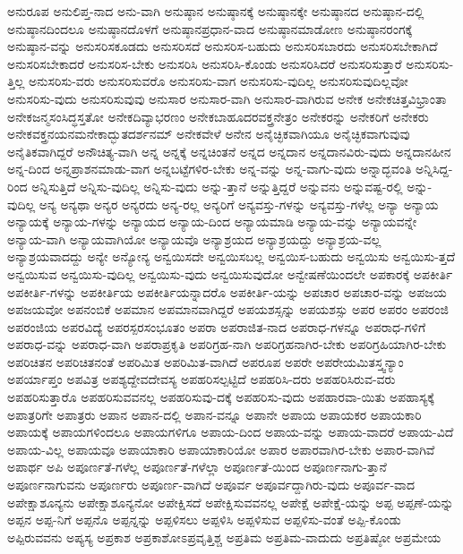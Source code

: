 {ಅನುರೂಪ
ಅನುಲಿಪ್ತ-ನಾದ
ಅನು-ವಾಗಿ
ಅನುಷ್ಠಾನ
ಅನುಷ್ಠಾನಕ್ಕೆ
ಅನುಷ್ಠಾನಕ್ಕೇ
ಅನುಷ್ಠಾನದ
ಅನುಷ್ಠಾನ-ದಲ್ಲಿ
ಅನುಷ್ಠಾನದಿಂದಲೂ
ಅನುಷ್ಠಾನದೊಳಗೆ
ಅನುಷ್ಠಾನಪ್ರಧಾನ-ವಾದ
ಅನುಷ್ಠಾನಮಾಡೋಣ
ಅನುಷ್ಠಾನರಂಗಕ್ಕೆ
ಅನುಷ್ಠಾನ-ವನ್ನು
ಅನುಸರಿಸಕೂಡದು
ಅನುಸರಿಸದೆ
ಅನುಸರಿಸ-ಬಹುದು
ಅನುಸರಿಸಬಾರದು
ಅನುಸರಿಸಬೇಕಾಗಿದೆ
ಅನುಸರಿಸಬೇಕಾದರೆ
ಅನುಸರಿಸ-ಬೇಕು
ಅನುಸರಿಸಿ
ಅನುಸರಿಸಿ-ಕೊಂಡು
ಅನುಸರಿಸಿದರೆ
ಅನುಸರಿಸುತ್ತಾರೆ
ಅನುಸರಿಸು-ತ್ತಿಲ್ಲ
ಅನುಸರಿಸು-ವರು
ಅನುಸರಿಸುವರೊ
ಅನುಸರಿಸು-ವಾಗ
ಅನುಸರಿಸು-ವುದಿಲ್ಲ
ಅನುಸರಿಸುವುದಿಲ್ಲವೋ
ಅನುಸರಿಸು-ವುದು
ಅನುಸರಿಸುವುವು
ಅನುಸಾರ
ಅನುಸಾರ-ವಾಗಿ
ಅನುಸಾರ-ವಾಗಿರುವ
ಅನೇಕ
ಅನೇಕಚಿತ್ತವಿಭ್ರಾಂತಾ
ಅನೇಕಜನ್ಮಸಂಸಿದ್ಧಸ್ತತೋ
ಅನೇಕದಿವ್ಯಾಭರಣಂ
ಅನೇಕಬಾಹೂದರವಕ್ತ್ರನೇತ್ರಂ
ಅನೇಕರನ್ನು
ಅನೇಕರಿಗೆ
ಅನೇಕರು
ಅನೇಕವಕ್ತ್ರನಯನಮನೇಕಾದ್ಭುತದರ್ಶನಮ್
ಅನೇಕವೇಳೆ
ಅನೇನ
ಅನೈಚ್ಛಿಕವಾಗಿಯೂ
ಅನೈಚ್ಛಿಕವಾಗುವುವು
ಅನೈತಿಕವಾಗಿದ್ದರೆ
ಅನೌಚಿತ್ಯ-ವಾಗಿ
ಅನ್ನ
ಅನ್ನಕ್ಕೆ
ಅನ್ನಚಿಂತನೆ
ಅನ್ನದ
ಅನ್ನದಾನ
ಅನ್ನದಾನವಿರು-ವುದು
ಅನ್ನದಾನಹೀನ
ಅನ್ನ-ದಿಂದ
ಅನ್ನಪ್ರಾಶನಮಾಡು-ವಾಗ
ಅನ್ನಬಟ್ಟೆಗಳಿರ-ಬೇಕು
ಅನ್ನ-ವನ್ನು
ಅನ್ನ-ವಾಗು-ವುದು
ಅನ್ನಾದ್ಭವಂತಿ
ಅನ್ನಿಸಿದ್ದ-ರಿಂದ
ಅನ್ನಿಸುತ್ತಿದೆ
ಅನ್ನಿಸು-ವುದಿಲ್ಲ
ಅನ್ನಿಸು-ವುದು
ಅನ್ನು-ತ್ತಾನೆ
ಅನ್ನುತ್ತಿದ್ದರೆ
ಅನ್ನುವನು
ಅನ್ನುವಷ್ಟ-ರಲ್ಲಿ
ಅನ್ನು-ವುದಿಲ್ಲ
ಅನ್ಯ
ಅನ್ಯಥಾ
ಅನ್ಯರ
ಅನ್ಯರದು
ಅನ್ಯ-ರಲ್ಲ
ಅನ್ಯರಿಗೆ
ಅನ್ಯವಸ್ತು-ಗಳನ್ನು
ಅನ್ಯವಸ್ತು-ಗಳೆಲ್ಲ
ಅನ್ಯಾ
ಅನ್ಯಾಯ
ಅನ್ಯಾಯಕ್ಕೆ
ಅನ್ಯಾಯ-ಗಳನ್ನು
ಅನ್ಯಾಯದ
ಅನ್ಯಾಯ-ದಿಂದ
ಅನ್ಯಾಯಮಾಡಿ
ಅನ್ಯಾಯ-ವನ್ನು
ಅನ್ಯಾಯವನ್ನೇ
ಅನ್ಯಾಯ-ವಾಗಿ
ಅನ್ಯಾಯವಾಗಿಯೋ
ಅನ್ಯಾಯವೊ
ಅನ್ಯಾಶ್ರಯದ
ಅನ್ಯಾಶ್ರಯದ್ದು
ಅನ್ಯಾಶ್ರಯ-ವಲ್ಲ
ಅನ್ಯಾಶ್ರಯವಾದದ್ದು
ಅನ್ಯೇ
ಅನ್ಯೋನ್ಯ
ಅನ್ವಯಿಸದೇ
ಅನ್ವಯಿಸಬಲ್ಲ
ಅನ್ವಯಿಸ-ಬಹುದು
ಅನ್ವಯಿಸು
ಅನ್ವಯಿಸು-ತ್ತದೆ
ಅನ್ವಯಿಸುವ
ಅನ್ವಯಿಸು-ವುದಿಲ್ಲ
ಅನ್ವಯಿಸು-ವುದು
ಅನ್ವಯಿಸುವುದೋ
ಅನ್ವೇಷಣೆಯಿಂದಲೇ
ಅಪಕಾರಕ್ಕೆ
ಅಪಕೀರ್ತಿ
ಅಪಕೀರ್ತಿ-ಗಳನ್ನು
ಅಪಕೀರ್ತಿಯ
ಅಪಕೀರ್ತಿಯನ್ನಾದರೊ
ಅಪಕೀರ್ತಿ-ಯನ್ನು
ಅಪಚಾರ
ಅಪಚಾರ-ವನ್ನು
ಅಪಜಯ
ಅಪಜಯವೋ
ಅಪನಂಬಿಕೆ
ಅಪಮಾನ
ಅಪಮಾನವಾಗಿದ್ದರೆ
ಅಪಯಶಸ್ಸನ್ನು
ಅಪಯಶಸ್ಸು
ಅಪರ
ಅಪರಂ
ಅಪರಂಜಿ
ಅಪರಂಜಿಯ
ಅಪರವಿದ್ಯೆ
ಅಪರಸ್ಪರಸಂಭೂತಂ
ಅಪರಾ
ಅಪರಾಜಿತ-ನಾದ
ಅಪರಾಧ-ಗಳನ್ನೂ
ಅಪರಾಧ-ಗಳಿಗೆ
ಅಪರಾಧ-ವನ್ನು
ಅಪರಾಧ-ವಾಗಿ
ಅಪರಾಪ್ರಕೃತಿ
ಅಪರಿಗ್ರಹ-ನಾಗಿ
ಅಪರಿಗ್ರಹನಾಗಿರ-ಬೇಕು
ಅಪರಿಗ್ರಹಿಯಾಗಿರ-ಬೇಕು
ಅಪರಿಚಿತನ
ಅಪರಿಚಿತನಂತೆ
ಅಪರಿಮಿತ
ಅಪರಿಮಿತ-ವಾಗಿದೆ
ಅಪರೂಪ
ಅಪರೇ
ಅಪರೇಯಮಿತಸ್ತ್ವನ್ಯಾಂ
ಅಪರ್ಯಾಪ್ತಂ
ಅಪವಿತ್ರ
ಅಪಶ್ಯದ್ದೇವದೇವಸ್ಯ
ಅಪಹರಿಸಲ್ಪಟ್ಟಿದೆ
ಅಪಹರಿಸಿ-ದರು
ಅಪಹರಿಸಿರುವ-ವರು
ಅಪಹರಿಸುತ್ತಾರೊ
ಅಪಹರಿಸುವವನಲ್ಲ
ಅಪಹರಿಸುವು-ದಕ್ಕೆ
ಅಪಹರಿಸು-ವುದು
ಅಪಹಾರವಾ-ಯಿತು
ಅಪಹಾಸ್ಯಕ್ಕೆ
ಅಪಾತ್ರರಿಗೇ
ಅಪಾತ್ರರು
ಅಪಾನ
ಅಪಾನ-ದಲ್ಲಿ
ಅಪಾನ-ವನ್ನೂ
ಅಪಾನೇ
ಅಪಾಯ
ಅಪಾಯಕರ
ಅಪಾಯಕಾರಿ
ಅಪಾಯಕ್ಕೆ
ಅಪಾಯಗಳಿಂದಲೂ
ಅಪಾಯಗಳಿಗೂ
ಅಪಾಯ-ದಿಂದ
ಅಪಾಯ-ವನ್ನು
ಅಪಾಯ-ವಾದರೆ
ಅಪಾಯ-ವಿದೆ
ಅಪಾಯ-ವಿಲ್ಲ
ಅಪಾಯವೂ
ಅಪಾಯಾಕಾರಿ
ಅಪಾಯಾಕಾರಿಯೋ
ಅಪಾರ
ಅಪಾರವಾಗಿರ-ಬೇಕು
ಅಪಾರ-ವಾಗಿವೆ
ಅಪಾರ್ಥ
ಅಪಿ
ಅಪೂರ್ಣತೆ-ಗಳೆಲ್ಲ
ಅಪೂರ್ಣತೆ-ಗಳೆಲ್ಲಾ
ಅಪೂರ್ಣತೆ-ಯಿಂದ
ಅಪೂರ್ಣನಾಗು-ತ್ತಾನೆ
ಅಪೂರ್ಣನಾಗುವನು
ಅಪೂರ್ಣರು
ಅಪೂರ್ಣ-ವಾಗಿದೆ
ಅಪೂರ್ವ
ಅಪೂರ್ವದ್ದಾಗಿರು-ವುದು
ಅಪೂರ್ವ-ವಾದ
ಅಪೇಕ್ಷಾಶೂನ್ಯನು
ಅಪೇಕ್ಷಾಶೂನ್ಯನೋ
ಅಪೇಕ್ಷಿಸದೆ
ಅಪೇಕ್ಷಿಸುವವನಲ್ಲ
ಅಪೇಕ್ಷೆ
ಅಪೇಕ್ಷೆ-ಯನ್ನು
ಅಪ್ಪ
ಅಪ್ಪಣೆ-ಯನ್ನು
ಅಪ್ಪನ
ಅಪ್ಪ-ನಿಗೆ
ಅಪ್ಪನೊ
ಅಪ್ಪನ್ನನ್ನು
ಅಪ್ಪಳಿಸಲು
ಅಪ್ಪಳಿಸಿ
ಅಪ್ಪಳಿಸುವ
ಅಪ್ಪಳಿಸು-ವಂತೆ
ಅಪ್ಪಿ-ಕೊಂಡು
ಅಪ್ಪಿರುವವನು
ಅಪ್ಯಸ್ಯ
ಅಪ್ರಕಾಶ
ಅಪ್ರಕಾಶೋಽಪ್ರವೃತ್ತಿಶ್ಚ
ಅಪ್ರತಿಮ
ಅಪ್ರತಿಮ-ವಾದುದು
ಅಪ್ರತಿಷ್ಠೋ
ಅಪ್ರಮೇಯ
}
